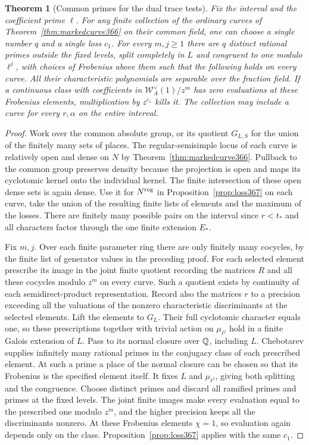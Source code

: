 \documentclass[a4paper,11pt]{article}
\newtheorem{theorem}[proposition]{Theorem}
\theoremstyle{definition}
\theoremstyle{remark}
\numberwithin{equation}{section}
\begin{document}
\begin{theorem}[Common primes for the dual trace tests]
\label{thm:primes367}
Fix the interval and the coefficient prime \(\ell\). For
any finite collection of the ordinary curves of
Theorem~\ref{thm:markedcurve366} on their common field,
one can choose a single number \(q\) and a single loss \(c_1\).
For every \(m,j\ge1\) there are \(q\) distinct rational primes
outside the fixed levels, split completely in \(L\) and
congruent to one modulo \(\ell^j\), with choices of
Frobenius above them such that the following holds on every
curve. All their characteristic polynomials are separable over
the fraction field. If a continuous class with coefficients
in \(\mathcal W_A^\vee(1)/z^m\) has zero evaluations at these
Frobenius elements, multiplication by \(z^{c_1}\) kills it.
The collection may include a curve for every \(r,\alpha\)
on the entire interval.
\end{theorem}
\begin{proof}
Work over the common absolute group, or its quotient \(G_{L,S}\)
for the union of the finitely many sets of places. The
regular-semisimple locus of each curve is relatively open
and dense on \(N\) by Theorem~\ref{thm:markedcurve366}.
Pullback to the common group preserves density because the
projection is open and maps its cyclotomic kernel onto the
individual kernel. The finite intersection of these open
dense sets is again dense. Use it for \(N^{\rm reg}\)
in Proposition~\ref{prop:loss367} on each curve, take the union
of the resulting finite lists of elements and the maximum of
the losses. There are finitely many possible pairs on the
interval since \(r<t_*\) and all characters factor through
the one finite extension \(E_*\).

Fix \(m,j\). Over each finite parameter ring there are
only finitely many cocycles, by the finite list of generator
values in the preceding proof. For each selected element
prescribe its image in the joint finite quotient recording
the matrices \(R\) and all these cocycles modulo \(z^m\)
on every curve. Such a quotient exists by continuity of each
semidirect-product representation. Record also the matrices
\(r\) to a precision exceeding all the valuations of the
nonzero characteristic discriminants at the selected
elements. Lift the elements to \(G_L\). Their full
cyclotomic character equals one, so these prescriptions
together with trivial action on \(\mu_{\ell^j}\) hold in
a finite Galois extension of \(L\). Pass to its normal
closure over \(\mathbb Q\), including \(L\). Chebotarev supplies
infinitely many rational primes in the conjugacy class of
each prescribed element. At such a prime a place of the
normal closure can be chosen so that its Frobenius is the
specified element itself. It fixes \(L\) and \(\mu_{\ell^j}\),
giving both splitting and the congruence. Choose distinct
primes and discard all ramified primes and primes at the
fixed levels. The joint finite images make every evaluation
equal to the prescribed one modulo \(z^m\), and the higher
precision keeps all the discriminants nonzero. At these
Frobenius elements \(\chi=1\), so evaluation again depends
only on the class. Proposition~\ref{prop:loss367} applies
with the same \(c_1\).
\end{proof}
\end{document}
